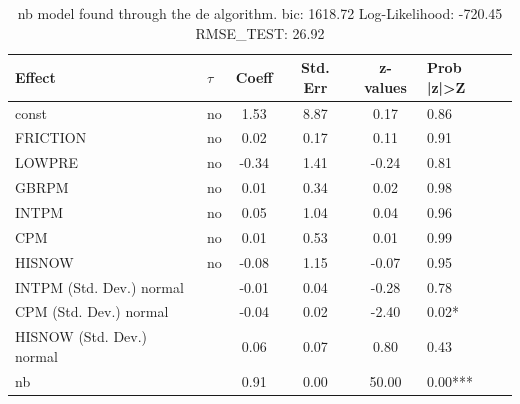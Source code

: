 \begin{table}
	\caption{nb model found through the de algorithm. bic: 1618.72 Log-Likelihood: -720.45 RMSE_TEST: 26.92}
	\begin{center}
		\begin{tabular}{|l|l|c|c|c|l|}
			\hline
			Effect & $\tau$ & Coeff & Std. Err & z-values & Prob |z|>Z \\
			\hline
			const & no & 1.53 & 8.87 & 0.17 & 0.86 \\
			\hline
			FRICTION & no & 0.02 & 0.17 & 0.11 & 0.91 \\
			\hline
			LOWPRE & no & -0.34 & 1.41 & -0.24 & 0.81 \\
			\hline
			GBRPM & no & 0.01 & 0.34 & 0.02 & 0.98 \\
			\hline
			INTPM & no & 0.05 & 1.04 & 0.04 & 0.96 \\
			\hline
			CPM & no & 0.01 & 0.53 & 0.01 & 0.99 \\
			\hline
			HISNOW & no & -0.08 & 1.15 & -0.07 & 0.95 \\
			\hline
			INTPM (Std. Dev.) normal &  & -0.01 & 0.04 & -0.28 & 0.78 \\
			\hline
			CPM (Std. Dev.) normal &  & -0.04 & 0.02 & -2.40 & 0.02* \\
			\hline
			HISNOW (Std. Dev.) normal &  & 0.06 & 0.07 & 0.80 & 0.43 \\
			\hline
			nb &  & 0.91 & 0.00 & 50.00 & 0.00*** \\
			\hline
		\end{tabular}
	\end{center}
\end{table}